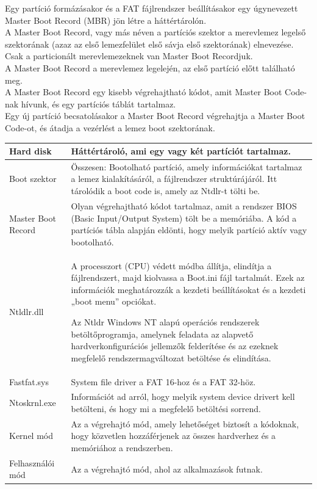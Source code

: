 \documentclass[tikz,12pt,margin=0px]{article}
\begin{document}
    \noindent Egy partíció formázásakor és a FAT fájlrendszer beállításakor egy úgynevezett Master Boot Record (MBR) jön létre a háttértárolón.\\

    \noindent A Master Boot Record, vagy más néven a partíciós szektor a merevlemez legelső szektorának (azaz az első lemezfelület első sávja első szektorának) elnevezése. \\

    \noindent Csak a particionált merevlemezeknek van Master Boot Recordjuk. \\

    \noindent A Master Boot Record a merevlemez legelején, az első partíció előtt található meg.\\

    \noindent A Master Boot Record egy kisebb végrehajtható kódot, amit Master Boot Code-nak hívunk, és egy partíciós táblát tartalmaz. \\

    \noindent Egy új partíció becsatolásakor a Master Boot Record végrehajtja a Master Boot Code-ot, és átadja a vezérlést a lemez boot szektorának.\\

    \renewcommand{\arraystretch}{2}
    {\footnotesize
      \begin{tabular}{|p{6cm}|p{8cm}|} \hline
      Hard disk & Háttértároló, ami egy vagy két partíciót tartalmaz. \\ \hline
      Boot szektor & Összesen: Bootolható partíció, amely információkat tartalmaz a lemez kialakításáról, a fájlrendszer struktúrájáról. Itt tárolódik a boot code is, amely az Ntdlr-t tölti be. \\ \hline
      Master Boot Record & Olyan végrehajtható kódot tartalmaz, amit a rendszer BIOS (Basic Input/Output System) tölt be a memóriába. A kód a partíciós tábla alapján eldönti, hogy melyik partíció aktív vagy bootolható. \\ \hline
      Ntldlr.dll & A processzort (CPU) védett módba állítja, elindítja a fájlrendszert, majd kiolvassa a Boot.ini fájl tartalmát. Ezek az információk meghatározzák a kezdeti beállításokat és a kezdeti „boot menu” opciókat.

Az Ntldr Windows NT alapú operációs rendszerek betöltőprogramja, amelynek feladata az alapvető hardverkonfigurációs jellemzők felderítése és az ezeknek megfelelő rendszermagváltozat betöltése és elindítása. \\ \hline
      Fastfat.sys & System file driver a FAT 16-hoz és a FAT 32-höz.  \\ \hline
      Ntoskrnl.exe & Információt ad arról, hogy melyik system device drivert kell betölteni, és hogy mi a megfelelő betöltési sorrend. \\ \hline
      Kernel mód & Az a végrehajtó mód, amely lehetőséget biztosít a kódoknak, hogy közvetlen hozzáférjenek az összes hardverhez és a memóriához a rendszerben. \\ \hline
      Felhasználói mód & Az a végrehajtó mód, ahol az alkalmazások futnak. \\ \hline
      \end{tabular}
    }
    \renewcommand{\arraystretch}{1}\\
\end{document}
